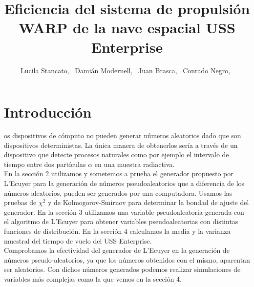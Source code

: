 \documentclass[10pt,journal,compsoc]{IEEEtran}
\begin{document}
\title{Eficiencia del sistema de propulsi\'on WARP de la nave espacial USS Enterprise}


\author{Lucila Stancato,~
		Dami\'an Modernell,~
		Juan Brasca,~
		Conrado Negro,~%

}


\maketitle

\IEEEdisplaynotcompsoctitleabstractindextext

\IEEEpeerreviewmaketitle

\section{Introducci\'on}

os dispositivos de c\'omputo no pueden generar n\'umeros aleatorios dado que 
son dispositivos deterministas. La \'unica manera de obtenerlos ser\'ia a trav\'es de un dispositivo
que detecte procesos naturales como por ejemplo el intervalo de tiempo entre dos part\'iculas $\alpha$
en una muestra radiactiva.\\
\indent En la secci\'on 2 utilizamos y sometemos a prueba el generador propuesto por L'Ecuyer para la
generaci\'on de n\'umeros pseudoaleatorios que a diferencia de los n\'umeros aleatorios, pueden 
ser generados por una computadora. Usamos las pruebas de $\chi^2$ y de Kolmogorov-Smirnov para determinar la bondad de ajuste del
generador. En la secci\'on 3 utilizamos una variable pseudoaleatoria generada con el algoritmo de L'Ecuyer para
obtener variables pseudoaleatorias con distintas funciones de distribuci\'on. En la secci\'on 4 
calculamos la media y la varianza muestral del tiempo de vuelo del USS Enterprise.\\
Comprobamos la efectividad del generador de L'Ecuyer en la generaci\'on de n\'umeros pseudo-aleatorios,
 ya que los n\'umeros obtenidos con el mismo, aparentan ser aleatorios. Con dichos n\'umeros generados podemos realizar
simulaciones de variables m\'as complejas como la que vemos en la secci\'on 4. \\
\indent
\end{document}
